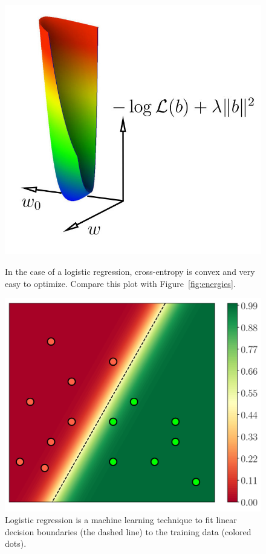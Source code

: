 \documentclass[notitlepage,oneside]{book}
\begin{document}
\begin{figure}[t]
\begin{minipage}{.45\linewidth}
    \centering
    \includegraphics[width=.7\linewidth]{ls-vs-crossentropy-energies2.jpg}
    \caption{In the case of a logistic regression, cross-entropy is convex and very easy to optimize. Compare this plot with Figure~\ref{fig:energies}.}
    \label{fig:energy}
\end{minipage}
\hspace{.05\linewidth}
\begin{minipage}{.45\linewidth}
    \centering
    \includegraphics[width=.8\linewidth]{logistic-regression-2d.png}
    \caption{Logistic regression is a machine learning technique to fit linear decision boundaries (the dashed line) to the training data (colored dots).}
    \label{fig:logistic2d}
\end{minipage}
\end{figure}
\end{document}
